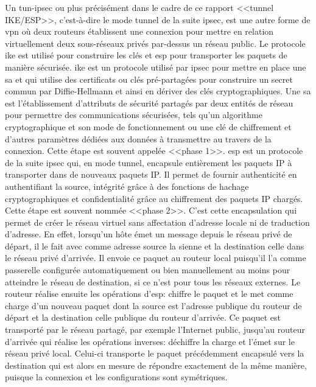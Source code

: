 \documentclass[12pt, oneside, a4paper, titlepage]{report}
\begin{document}
Un \gls{tun-ipsec} ou plus précisément dans le cadre de ce rapport <<tunnel
IKE/ESP>>, c'est-à-dire le mode tunnel de la suite \gls{ipsec}, est une autre
forme de \gls{vpn} où deux routeurs établissent une connexion pour mettre en
relation virtuellement deux sous-réseaux privés par-dessus un réseau public. Le
protocole \gls{ike} est utilisé pour construire les clés et \gls{esp} pour
transporter les paquets de manière sécurisée. \gls{ike} est un protocole utilisé
par \gls{ipsec} pour mettre en place une \gls{sa} et qui utilise des certificats
ou clés pré-partagées pour construire un secret commun par Diffie-Hellmann et
ainsi en dériver des clés cryptographiques. Une \gls{sa} est l'établissement
d'attributs de sécurité partagés par deux entités de réseau pour permettre des
communications sécurisées, tels qu'un algorithme cryptographique et son mode de
fonctionnement ou une clé de chiffrement et d'autres paramètres dédiées aux
données à transmettre au travers de la connexion. Cette étape est souvent
appelée <<phase 1>>. \gls{esp} est un protocole de la suite \gls{ipsec} qui, en
mode tunnel, encapsule entièrement les paquets IP à transporter dans de nouveaux
paquets IP\@. Il permet de fournir authenticité en authentifiant la source,
intégrité grâce à des fonctions de hachage cryptographiques et confidentialité
grâce au chiffrement des paquets IP chargés.  Cette étape est souvent nommée
<<phase 2>>. C'est cette encapsulation qui permet de créer le réseau virtuel
sans affectation d'adresse locale ni de traduction d'adresse. En effet,
lorsqu'un hôte émet un message depuis le réseau privé de départ, il le fait avec
comme adresse source la sienne et la destination celle dans le réseau privé
d'arrivée. Il envoie ce paquet au routeur local puisqu'il l'a comme passerelle
configurée automatiquement ou bien manuellement au moins pour atteindre le
réseau de destination, si ce n'est pour tous les réseaux externes. Le routeur
réalise ensuite les opérations d'\gls{esp}: chiffre le paquet et le met comme
charge d'un nouveau paquet dont la source est l'adresse publique du routeur de
départ et la destination celle publique du routeur d'arrivée. Ce paquet est
transporté par le réseau partagé, par exemple l'Internet public, jusqu'au
routeur d'arrivée qui réalise les opérations inverses: déchiffre la charge et
l'émet sur le réseau privé local. Celui-ci transporte le paquet précédemment
encapsulé vers la destination qui est alors en mesure de répondre exactement de
la même manière, puisque la connexion et les configurations sont symétriques.
\end{document}
